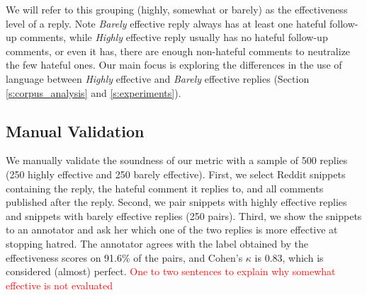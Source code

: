 \documentclass[11pt]{article}
\begin{document}
We will refer to this grouping (highly, somewhat or barely) as the effectiveness level of a reply.
Note \emph{Barely} effective reply always has at least one hateful follow-up comments, 
while
\emph{Highly} effective reply usually has no hateful follow-up comments, or even it has, there are enough non-hateful comments to neutralize the few hateful ones.
Our main focus is exploring the differences in the use of language between \emph{Highly} effective and \emph{Barely} effective replies (Section \ref{s:corpus_analysis} and \ref{s:experiments}).

\subsection{Manual Validation}
We manually validate the soundness of our metric with a sample of 500 replies (250 highly effective and 250 barely effective).
First, we select Reddit snippets containing
the reply, 
the hateful comment it replies to, 
and all comments published after the reply.
Second, we pair snippets with highly effective replies and snippets with barely effective replies (250 pairs).
Third, we show the snippets to an annotator
and ask her which one of the two replies is more effective at stopping hatred.
The annotator agrees with the label obtained by the effectiveness scores on 91.6\% of the pairs,
and Cohen's $\kappa$ is 0.83, which is considered (almost) perfect.
\textcolor{red}{One to two sentences to explain why somewhat effective is not evaluated}
\end{document}
